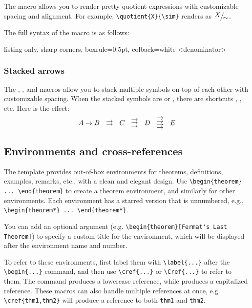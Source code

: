 The \custommacro{\quotient} macro allows you to render pretty quotient expressions with customizable spacing and alignment.
For example, \verb|\quotient{X}{\sim}| renders as $\quotient{X}{\sim}$.

The full syntax of the \custommacro{\quotient} macro is as follows:
\begin{tcblisting}{listing only, sharp corners, boxrule=0.5pt, colback=white}
  {<denominator>}
\end{tcblisting}

\subsubsection{Stacked arrows}

The \custommacro{\doublestack}, \custommacro{\triplestack}, and \custommacro{\quadrustack} macros allow you to stack multiple symbols on top of each other with customizable spacing.
When the stacked symbols are \custommacro{\leftarrow} or \custommacro{\rightarrow}, there are shortcuts \custommacro{\doubleleftarrows}, \custommacro{\doublerightarrows}, etc.
Here is the effect:
\[
  A \to B \doublerightarrows C \triplerightarrows D \quadrurightarrows E
\]

\subsection{Environments and cross-references}

The template provides out-of-box environments for theorems, definitions, examples, remarks, etc., with a clean and elegant design.
Use \verb|\begin{theorem} ... \end{theorem}| to create a theorem environment, and similarly for other environments.
Each environment has a starred version that is unnumbered, e.g., \verb|\begin{theorem*} ... \end{theorem*}|.

You can add an optional argument (e.g. \verb|\begin{theorem}[Fermat's Last Theorem]|) to specify a custom title for the environment, which will be displayed after the environment name and number.

To refer to these environments, first label them with \verb|\label{...}| after the \verb|\begin{...}| command, and then use \verb|\cref{...}| or \verb|\Cref{...}| to refer to them.
The \custommacro{\cref} command produces a lowercase reference, while \custommacro{\Cref} produces a capitalized reference.
These macros can also handle multiple references at once, e.g. \verb|\cref{thm1,thm2}| will produce a reference to both \texttt{thm1} and \texttt{thm2}.

